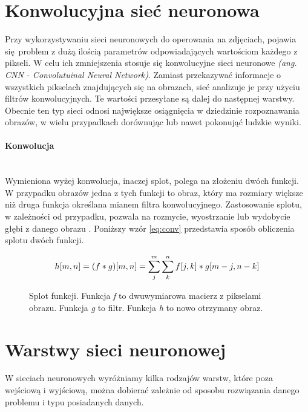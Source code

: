 \section{Konwolucyjna sieć neuronowa}

Przy wykorzystywaniu sieci neuronowych do operowania na zdjęciach, pojawia się problem
z dużą ilością parametrów odpowiadających wartościom każdego z pikseli.
W celu ich zmniejszenia stosuje się konwolucyjne sieci neuronowe \textit{(ang. CNN - Convolutuinal Neural Network)}.
Zamiast przekazywać informacje o wszystkich pikselach znajdujących się
na obrazach, sieć analizuje je przy użyciu filtrów konwolucyjnych.
Te wartości przesyłane są dalej do następnej warstwy.\\
Obecnie ten typ sieci odnosi największe osiągnięcia w dziedzinie rozpoznawania obrazów,
w wielu przypadkach dorównując lub nawet pokonująć ludzkie wyniki.

\paragraph{Konwolucja} \mbox{}\\
Wymieniona wyżej konwolucja, inaczej splot, polega na złożeniu dwóch funkcji. W przypadku obrazów
jedna z tych funkcji to obraz, który ma rozmiary większe niż druga funkcja określana
mianem filtra konwolucyjnego. Zastosowanie splotu, w zależności od przypadku,
pozwala na rozmycie, wyostrzanie lub wydobycie głębi z danego obrazu \cite{konwolucja}.
Poniższy wzór \ref{eq:conv} przedstawia sposób obliczenia splotu dwóch funkcji.
\begin{figure}[h!]
\renewcommand{\figurename}{Wzór}%
\begin{equation} \label{eq:conv}
h[m, n] = (f * g)[m, n] = \sum_j^m \sum_k^n f[j, k] * g[m-j, n-k] \\
\end{equation}
\centering
\captionsetup{justification=centering,margin=1cm}
\caption{Splot funkcji. Funkcja \textit{f} to dwuwymiarowa macierz z pikselami obrazu. Funkcja \textit{g} to filtr. Funkcja \textit{h} to nowo otrzymany obraz.}
\end{figure}

\section{Warstwy sieci neuronowej}

W sieciach neuronowych wyróżniamy kilka rodzajów warstw, które poza wejściową i wyjściową,
można dobierać zależnie od sposobu rozwiązania danego problemu i typu posiadanych danych.

